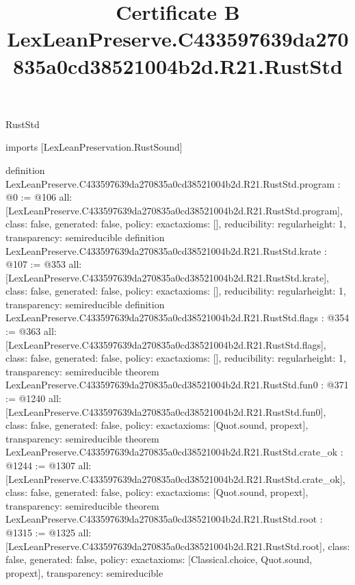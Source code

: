 \begin{lexlean}{RustStd}
\title{Certificate B LexLeanPreserve.C433597639da270835a0cd38521004b2d.R21.RustStd}
\begin{coremodule}
imports [LexLeanPreservation.RustSound]

definition LexLeanPreserve.C433597639da270835a0cd38521004b2d.R21.RustStd.program : @0 := @106 {
  all: [LexLeanPreserve.C433597639da270835a0cd38521004b2d.R21.RustStd.program],
  class: false,
  generated: false,
  policy: exact{axioms: []},
  reducibility: regular{height: 1},
  transparency: semireducible
}
definition LexLeanPreserve.C433597639da270835a0cd38521004b2d.R21.RustStd.krate : @107 := @353 {
  all: [LexLeanPreserve.C433597639da270835a0cd38521004b2d.R21.RustStd.krate],
  class: false,
  generated: false,
  policy: exact{axioms: []},
  reducibility: regular{height: 1},
  transparency: semireducible
}
definition LexLeanPreserve.C433597639da270835a0cd38521004b2d.R21.RustStd.flags : @354 := @363 {
  all: [LexLeanPreserve.C433597639da270835a0cd38521004b2d.R21.RustStd.flags],
  class: false,
  generated: false,
  policy: exact{axioms: []},
  reducibility: regular{height: 1},
  transparency: semireducible
}
theorem LexLeanPreserve.C433597639da270835a0cd38521004b2d.R21.RustStd.fun0 : @371 := @1240 {
  all: [LexLeanPreserve.C433597639da270835a0cd38521004b2d.R21.RustStd.fun0],
  class: false,
  generated: false,
  policy: exact{axioms: [Quot.sound, propext]},
  transparency: semireducible
}
theorem LexLeanPreserve.C433597639da270835a0cd38521004b2d.R21.RustStd.crate_ok : @1244 := @1307 {
  all: [LexLeanPreserve.C433597639da270835a0cd38521004b2d.R21.RustStd.crate_ok],
  class: false,
  generated: false,
  policy: exact{axioms: [Quot.sound, propext]},
  transparency: semireducible
}
theorem LexLeanPreserve.C433597639da270835a0cd38521004b2d.R21.RustStd.root : @1315 := @1325 {
  all: [LexLeanPreserve.C433597639da270835a0cd38521004b2d.R21.RustStd.root],
  class: false,
  generated: false,
  policy: exact{axioms: [Classical.choice, Quot.sound, propext]},
  transparency: semireducible
}


\end{coremodule}
\end{lexlean}
